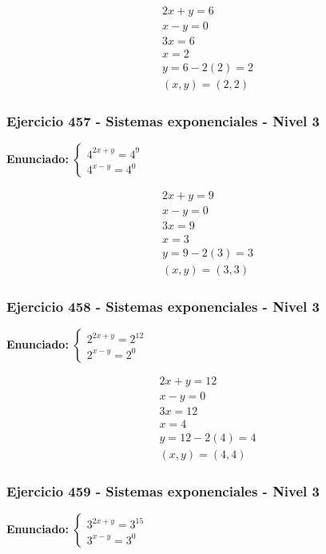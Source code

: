 \documentclass[12pt,a4paper]{article}
\begin{document}
\[
\begin{aligned}
2x+y=6\\
x-y=0\\
3x=6\\
x=2\\
y=6-2(2)=2\\
\boxed{(x,y)=(2,2)}
\end{aligned}
\]


\subsubsection*{Ejercicio 457 - Sistemas exponenciales - Nivel 3}
\textbf{Enunciado:} \(\begin{cases} 4^{2x+y}=4^{9}\\ 4^{x-y}=4^{0}\end{cases}\)

\[
\begin{aligned}
2x+y=9\\
x-y=0\\
3x=9\\
x=3\\
y=9-2(3)=3\\
\boxed{(x,y)=(3,3)}
\end{aligned}
\]


\subsubsection*{Ejercicio 458 - Sistemas exponenciales - Nivel 3}
\textbf{Enunciado:} \(\begin{cases} 2^{2x+y}=2^{12}\\ 2^{x-y}=2^{0}\end{cases}\)

\[
\begin{aligned}
2x+y=12\\
x-y=0\\
3x=12\\
x=4\\
y=12-2(4)=4\\
\boxed{(x,y)=(4,4)}
\end{aligned}
\]


\subsubsection*{Ejercicio 459 - Sistemas exponenciales - Nivel 3}
\textbf{Enunciado:} \(\begin{cases} 3^{2x+y}=3^{15}\\ 3^{x-y}=3^{0}\end{cases}\)
\end{document}

